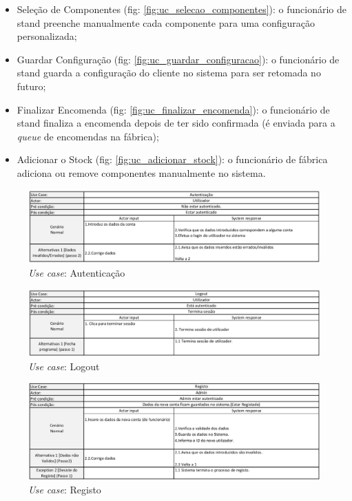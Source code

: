 \begin{itemize}
    \item Seleção de Componentes (fig: \ref{fig:uc_selecao_componentes}): o funcionário de stand preenche manualmente cada componente para uma configuração personalizada;
    \item Guardar Configuração (fig: \ref{fig:uc_guardar_configuracao}): o funcionário de stand guarda a configuração do cliente no sistema para ser retomada no futuro;
    \item Finalizar Encomenda (fig: \ref{fig:uc_finalizar_encomenda}): o funcionário de stand finaliza a encomenda depois de ter sido confirmada (é enviada para a \textit{queue} de encomendas na fábrica);
    \item Adicionar o Stock (fig: \ref{fig:uc_adicionar_stock}): o funcionário de fábrica adiciona ou remove componentes manualmente no sistema.
\end{itemize}

\begin{figure}[ht]
    \centering
    \includegraphics[width=\textwidth]{analise_de_requisitos/img/use_cases/autenticacao.png}
    \caption{\textit{Use case}: Autenticação}
    \label{fig:uc_autenticacao}
\end{figure}

\begin{figure}[ht]
    \centering
    \includegraphics[width=\textwidth]{analise_de_requisitos/img/use_cases/logout.png}
    \caption{\textit{Use case}: Logout}
    \label{fig:uc_logout}
\end{figure}

\begin{figure}[ht]
    \centering
    \includegraphics[width=\textwidth]{analise_de_requisitos/img/use_cases/registo.png}
    \caption{\textit{Use case}: Registo}
    \label{fig:uc_registo}
\end{figure}

